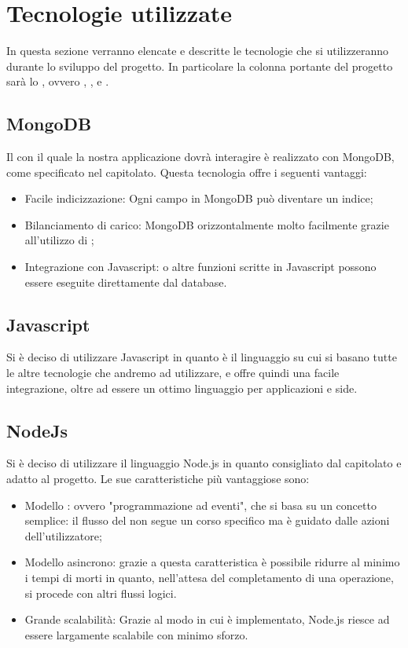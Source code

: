 \newpage
\section{Tecnologie utilizzate}
In questa sezione verranno elencate e descritte le tecnologie che si utilizzeranno durante lo sviluppo del progetto. In particolare la colonna portante del progetto sarà lo  , ovvero , ,  e .

\subsection{MongoDB}
Il  con il quale la nostra applicazione dovrà interagire è realizzato con MongoDB, come specificato nel capitolato. Questa tecnologia offre i seguenti vantaggi:
\begin{itemize}
\item Facile indicizzazione: Ogni campo in MongoDB può diventare un indice;
\item Bilanciamento di carico: MongoDB  orizzontalmente molto facilmente grazie all'utilizzo di ;
\item Integrazione con Javascript:  o altre funzioni scritte in Javascript possono essere eseguite direttamente dal database.
\end{itemize}

\subsection{Javascript}
Si è deciso di utilizzare Javascript in quanto è il linguaggio su cui si basano tutte le altre tecnologie che andremo ad utilizzare, e offre quindi una facile integrazione, oltre ad essere un ottimo linguaggio per applicazioni  e  side.

\subsection{NodeJs}
Si è deciso di utilizzare il linguaggio Node.js in quanto consigliato dal capitolato e adatto al progetto. Le sue caratteristiche più vantaggiose sono:
\begin{itemize}
\item Modello : ovvero "programmazione ad eventi", che si basa su un concetto semplice: il flusso del  non segue un corso specifico ma è guidato dalle azioni dell'utilizzatore;
\item Modello asincrono: grazie a questa caratteristica è possibile ridurre al minimo i tempi di morti in quanto, nell'attesa del completamento di una operazione, si procede con altri flussi logici.
\item Grande scalabilità: Grazie al modo in cui è implementato, Node.js riesce ad essere largamente scalabile con minimo sforzo.
\end{itemize}

